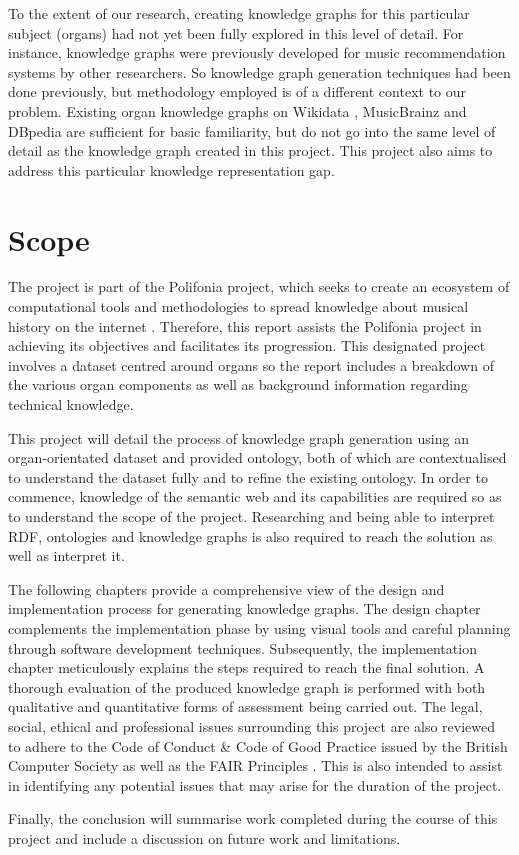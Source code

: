 To the extent of our research, creating knowledge graphs for this particular subject (organs) had not yet been fully explored in this level of detail. For instance, knowledge graphs were previously developed for music recommendation systems \cite{oramas2016sound} by other researchers. So knowledge graph generation techniques had been done previously, but methodology employed is of a different context to our problem. Existing organ knowledge graphs on Wikidata \cite{organwikidata}, MusicBrainz \cite{organmusicbrainz} and DBpedia \cite{organdbpedia} are sufficient for basic familiarity, but do not go into the same level of detail as the knowledge graph created in this project. This project also aims to address this particular knowledge representation gap. 

\section{Scope}
The project is part of the Polifonia project, which seeks to create an ecosystem of computational tools and methodologies to spread knowledge about musical history on the internet \cite{polifoniaproject}. Therefore, this report assists the Polifonia project in achieving its objectives and facilitates its progression. This designated project involves a dataset centred around organs so the report includes a breakdown of the various organ components as well as background information regarding technical knowledge. 

This project will detail the process of knowledge graph generation using an organ-orientated dataset and provided ontology, both of which are contextualised to understand the dataset fully and to refine the existing ontology. In order to commence, knowledge of the semantic web and its capabilities are required so as to understand the scope of the project. Researching and being able to interpret RDF, ontologies and knowledge graphs is also required to reach the solution as well as interpret it. 

The following chapters provide a comprehensive view of the design and implementation process for generating knowledge graphs. The design chapter complements the implementation phase by using visual tools and careful planning through software development techniques. Subsequently, the implementation chapter meticulously explains the steps required to reach the final solution. A thorough evaluation of the produced knowledge graph is performed with both qualitative and quantitative forms of assessment being carried out. The legal, social, ethical and professional issues surrounding this project are also reviewed to adhere to the Code of Conduct \& Code of Good Practice issued by the British Computer Society \cite{bcs} as well as the FAIR Principles \cite{fairprinciples}. This is also intended to assist in identifying any potential issues that may arise for the duration of the project.

Finally, the conclusion will summarise work completed during the course of this project and include a discussion on future work and limitations. 
